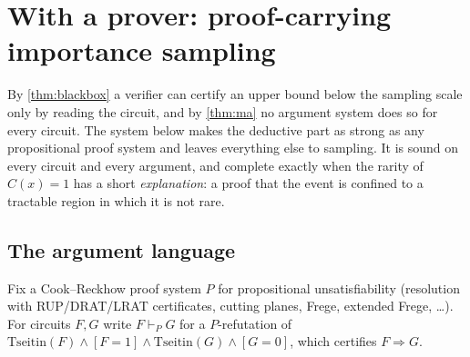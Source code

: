 \section{With a prover: proof-carrying importance sampling}\label{sec:part2}

By \cref{thm:blackbox} a verifier can certify an upper bound below the
sampling scale only by reading the circuit, and by \cref{thm:ma} no argument
system does so for every circuit. The system below makes the deductive part as
strong as any propositional proof system and leaves everything else to
sampling. It is sound on every circuit and every argument, and complete
exactly when the rarity of $C(x)=1$ has a short \emph{explanation}: a proof
that the event is confined to a tractable region in which it is not rare.

\subsection{The argument language}\label{sec:pcis}

Fix a Cook--Reckhow proof system $P$ for propositional unsatisfiability
(resolution with RUP/DRAT/LRAT certificates, cutting planes, Frege, extended
Frege, \dots). For circuits $F,G$ write $F\vdash_PG$ for a $P$-refutation of
$\mathrm{Tseitin}(F)\wedge[F=1]\wedge\mathrm{Tseitin}(G)\wedge[G=0]$, which
certifies $F\Rightarrow G$.

